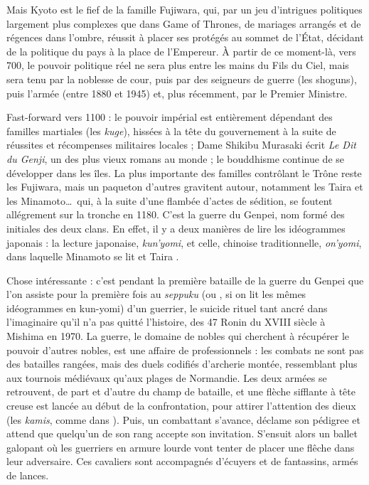 Mais Kyoto est le fief de la famille Fujiwara, qui, par un jeu d'intrigues
politiques largement plus complexes que dans Game of Thrones, de mariages
arrangés et de régences dans l'ombre, réussit à placer ses protégés au sommet
de l'État, décidant de la politique du pays à la place de l'Empereur. À partir
de ce moment-là, vers 700, le pouvoir politique réel ne sera plus entre les
mains du Fils du Ciel, mais sera tenu par la noblesse de cour, puis par des
seigneurs de guerre (les shoguns), puis l'armée (entre 1880 et 1945) et, plus
récemment, par le Premier Ministre.

Fast-forward vers 1100 : le pouvoir impérial est entièrement dépendant des
familles martiales (les \emph{kuge}), hissées à la tête du gouvernement à la
suite de réussites et récompenses militaires locales ; Dame Shikibu Murasaki
écrit \emph{Le Dit du Genji}, un des plus vieux romans au monde ; le bouddhisme
continue de se développer dans les îles. La plus importante des familles
contrôlant le Trône reste les Fujiwara, mais un paqueton d'autres gravitent
autour, notamment les Taira et les Minamoto\dots\ qui, à la suite d'une flambée
d'actes de sédition, se foutent allégrement sur la tronche en 1180. C'est la
guerre du Genpei, nom formé des initiales des deux clans. En effet, il y a deux
manières de lire les idéogrammes japonais : la lecture japonaise,
\emph{kun'yomi}, et celle, chinoise traditionnelle, \emph{on'yomi}, dans
laquelle Minamoto se lit  et Taira .

Chose intéressante : c'est pendant la première bataille de la guerre du Genpei
que l'on assiste pour la première fois au \emph{seppuku} (ou ,
si on lit les mêmes idéogrammes en kun-yomi) d'un guerrier, le suicide rituel
tant ancré dans l'imaginaire qu'il n'a pas quitté l'histoire, des 47 Ronin du
XVIII siècle à Mishima en 1970. La guerre, le domaine de nobles qui
cherchent à récupérer le pouvoir d'autres nobles, est une affaire de
professionnels : les combats ne sont pas des batailles rangées, mais des duels
codifiés d'archerie montée, ressemblant plus aux tournois médiévaux qu'aux
plages de Normandie. Les deux armées se retrouvent, de part et d'autre du
champ de bataille, et une flèche sifflante à tête creuse est lancée au début
de la confrontation, pour attirer l'attention des dieux (les \emph{kamis},
comme dans ). Puis, un combattant s'avance, déclame son
pédigree et attend que quelqu'un de son rang accepte son invitation. S'ensuit
alors un ballet galopant où les guerriers en armure lourde vont tenter de
placer une flêche dans leur adversaire. Ces cavaliers sont accompagnés
d'écuyers et de fantassins, armés de lances.

